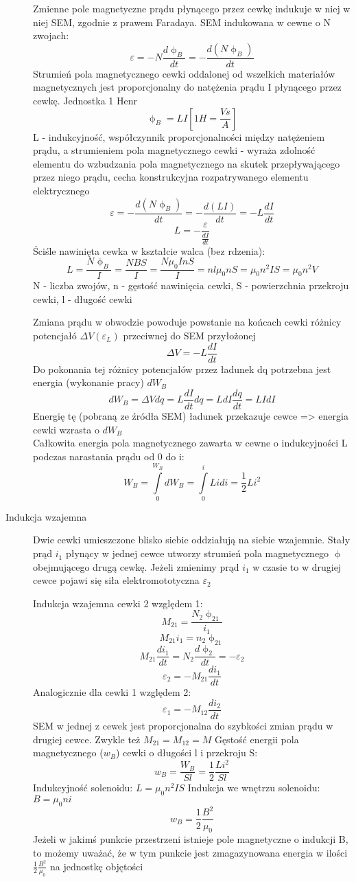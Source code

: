 \documentclass[a4paper,11pt]{article}
\begin{document}
\begin{description}
  Zmienne pole magnetyczne prądu płynącego przez cewkę indukuje w niej w niej SEM, zgodnie z prawem Faradaya. SEM indukowana w cewne o N zwojach:
  $$\varepsilon = -N\frac{d\upphi_B}{dt}=-\frac{d\left(N\upphi_B\right)}{dt}$$
  Strumień pola magnetycznego cewki oddalonej od wszelkich materiałów magnetycznych jest proporcjonalny do natężenia prądu I płynącego przez cewkę. Jednostka 1 Henr
  $$\upphi_B = LI \left[1H = \frac{Vs}{A}\right]$$
  L - indukcyjność, współczynnik proporcjonalności między natężeniem prądu, a strumieniem pola magnetycznego cewki - wyraża zdolność elementu do wzbudzania pola magnetycznego na skutek przepływającego przez niego prądu, cecha konstrukcyjna rozpatrywanego elementu elektrycznego
  $$\varepsilon = -\frac{d\left(N\upphi_B\right)}{dt} = -\frac{d\left(LI\right)}{dt} = -L\frac{dI}{dt}$$
  $$L=-\frac{\varepsilon}{\frac{dI}{dt}}$$
  Ściśle nawinięta cewka w kształcie walca (bez rdzenia):
  $$L=\frac{N\upphi_B}{I}=\frac{NBS}{I} = \frac{N\mu_0InS}{I}=nl\mu_0nS=\mu_0n^2IS=\mu_0n^2V$$
  N - liczba zwojów, n - gęstość nawinięcia cewki, S - powierzchnia przekroju cewki, l - długość cewki

  Zmiana prądu w obwodzie powoduje powstanie na końcach cewki różnicy potencjałó $\Delta V(\varepsilon_L)$ przeciwnej do SEM przyłożonej
  $$\Delta V=-L\frac{dI}{dt}$$
  Do pokonania tej różnicy potencjałów przez ładunek dq potrzebna jest energia (wykonanie pracy) $dW_B$
  $$dW_B = \Delta V dq = L\frac{dI}{dt}dq=LdI\frac{dq}{dt}=LIdI$$
  Energię tę (pobraną ze źródła SEM) ładunek przekazuje cewce => energia cewki wzrasta o $dW_B$\\
  Całkowita energia pola magnetycznego zawarta w cewne o indukcyjności L podczas narastania prądu od 0 do i:
  $$W_B = \int\limits^{W_B}_0 dW_B = \int\limits^{i}_0 Lidi = \frac{1}{2}Li^2$$
\item[Indukcja wzajemna] Dwie cewki umieszczone blisko siebie oddziałują na siebie wzajemnie. Stały prąd $i_1$ płynący w jednej cewce utworzy strumień pola magnetycznego $\upphi$ obejmującego drugą cewkę. Jeżeli zmienimy prąd $i_1$ w czasie to w drugiej cewce pojawi się siła elektromototyczna $\varepsilon_2$

  Indukcja wzajemna cewki 2 względem 1:
  $$M_{21} = \frac{N_2\upphi_{21}}{i_1}$$
  $$M_{21}i_1=n_2\upphi_{21}$$
  $$M_{21}\frac{di_1}{dt}=N_2\frac{d\upphi_2}{dt} = -\varepsilon_2$$
  $$\varepsilon_2 = -M_{21}\frac{di_1}{dt}$$
  Analogicznie dla cewki 1 względem 2:
  $$\varepsilon_1 = -M_{12}\frac{di_2}{dt}$$
  SEM w jednej z cewek jest proporcjonalna do szybkości zmian prądu w drugiej cewce. Zwykle też $M_{21} = M_{12} = M$
  Gęstość energii pola magnetycznego ($w_B$) cewki o długości l i przekroju S:
  $$w_B =\frac{W_B}{Sl}=\frac{1}{2}\frac{Li^2}{Sl}$$
  Indukcyjność solenoidu: $L=\mu_0n^2IS$
  Indukcja we wnętrzu solenoidu: $B = \mu_0ni$
  $$w_B=\frac{1}{2}\frac{B^2}{\mu_0}$$
  Jeżeli w jakimś punkcie przestrzeni istnieje pole magnetyczne o indukcji B, to możemy uważać, że w tym punkcie jest zmagazynowana energia w ilości $\frac{1}{2}\frac{B^2}{\mu_0}$ na jednostkę objętości


\end{description}
\end{document}
